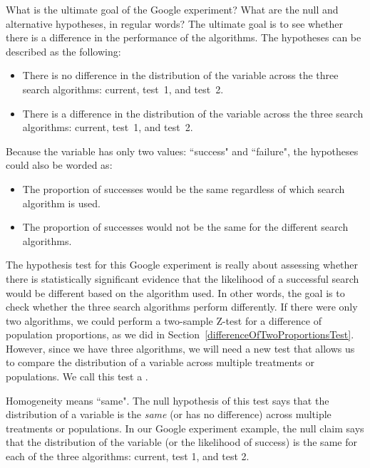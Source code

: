 \begin{examplewrap}
\label{searchalgorithmexample}
\begin{nexample}{What is the ultimate goal of the Google experiment? What are the null and alternative hypotheses, in regular words?}
The ultimate goal is to see whether there is a difference in the performance of the algorithms. The hypotheses can be described as the following:\D{\vspace{-2mm}}
\begin{itemize}
\setlength{\itemsep}{0mm}
\item[$H_0$:] There is no difference in the distribution of the  variable across the three search algorithms: current, test~1, and test~2.
\item[$H_A$:] There is a difference in the distribution of the  variable across the three search algorithms:  current, test~1, and  test~2.
\end{itemize}

Because the  variable has only two values: ``success" and ``failure", the hypotheses could also be worded as:
\begin{itemize}
\setlength{\itemsep}{0mm}
\item[$H_0$:] The proportion of successes would be the same regardless of which search algorithm is used.  
\item[$H_A$:] The proportion of successes would not be the same for the different search algorithms.  
\end{itemize}
\end{nexample}
\end{examplewrap}

The hypothesis test for this Google experiment is really about assessing whether there is statistically significant evidence that the likelihood of a successful search would be different based on the algorithm used.  In other words, the goal is to check whether the three search algorithms perform differently.  If there were only two algorithms, we could perform a two-sample Z-test for a difference of population proportions, as we did in Section~\ref{differenceOfTwoProportionsTest}.   However, since we have three algorithms, we will need a new test that allows us to compare the distribution of a variable across multiple treatments or populations.  We call this test a .  

Homogeneity means ``same".  The null hypothesis of this test says that the distribution of a variable is the \emph{same} (or has no difference) across multiple treatments or populations.  In our Google experiment example, the null claim says that the distribution of the  variable (or the likelihood of success) is the same for each of the three algorithms: current, test 1, and test 2.



